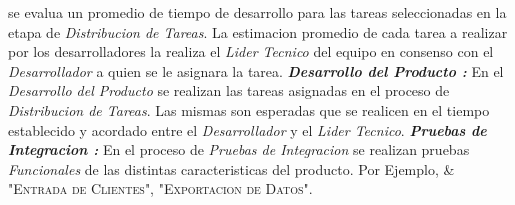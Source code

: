 \documentclass[
10pt, %
a4paper, %
oneside, %
headinclude,footinclude, %
BCOR5mm, %
]{scrartcl}
\begin{document}
\begin{flushleft}
  se evalua un promedio de tiempo de desarrollo  para las tareas seleccionadas
  en la etapa de \textit{Distribucion de Tareas}. La estimacion promedio de
  cada  tarea a realizar por los desarrolladores la realiza el
  \textit{Lider Tecnico} del equipo en consenso con el \textit{Desarrollador}
  a quien se le asignara la tarea.
  \newline  \newline
  \textbf{ \emph{Desarrollo del Producto : } } En el \textit{Desarrollo del Producto}
  se realizan las tareas asignadas en el proceso de \textit{Distribucion de Tareas}.
  Las mismas son esperadas que se realicen en el tiempo establecido y acordado
  entre el \textit{Desarrollador} y el \textit{Lider Tecnico}.
  \newline  \newline
  \textbf{ \emph{Pruebas de Integracion : } } En el proceso de
  \textit{Pruebas de Integracion} se realizan pruebas \emph{Funcionales} de
  las distintas caracteristicas del producto. Por Ejemplo,
  \newline
  \& "\textsc{Entrada de Clientes}", "\textsc{Exportacion de Datos}".

\pagebreak


\end{flushleft}
\end{document}
